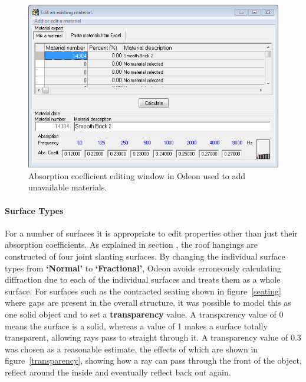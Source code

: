 \documentclass[../../main.tex]{subfiles}
\begin{document}
			\begin{figure}[H]
				\centerline{\includegraphics[scale = 0.9]{Sections/Implementation/Odeon/images/Absorption.PNG}}
				\caption{Absorption coefficient editing window in Odeon used to add unavailable materials.}
				\label{materialEdit}
			\end{figure}

		\paragraph{Surface Types}
			\label{surfaceTypes}

			For a number of surfaces it is appropriate to edit properties other than just their absorption coefficients. As explained in section , the roof hangings are constructed of four joint slanting surfaces. By changing the individual surface types from \textbf{`Normal'} to \textbf{`Fractional'}, Odeon avoids erroneously calculating diffraction due to each of the individual surfaces and treats them as a whole surface. For surfaces such as the contracted seating shown in figure~\ref{seating} where gaps are present in the overall structure, it was possible to model this as one solid object and to set a \textbf{transparency} value. A transparency value of 0 means the surface is a solid, whereas a value of 1 makes a surface totally transparent, allowing rays pass to straight through it. A transparency value of 0.3 was chosen as a reasonable estimate, the effects of which are shown in figure~\ref{transparency}, showing how a ray can pass through the front of the object, reflect around the inside and eventually reflect back out again.
\end{document}
